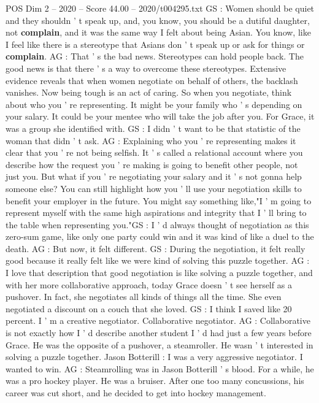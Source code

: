 \begin{textsample}{POS Dim 2 – 2020 – Score 44.00 – 2020/t004295.txt}
GS : Women should be quiet and they shouldn ' t speak up, and, you know, you should be a dutiful daughter, not \textbf{complain}, and it was the same way I felt about being Asian.
You know, like I feel like there is a stereotype that Asians don ' t speak up or ask for things or \textbf{complain}.
AG : That ' s the bad news.
Stereotypes can hold people back.
The good news is that there ' s a way to overcome these stereotypes.
Extensive evidence reveals that when women negotiate on behalf of others, the backlash vanishes.
Now being tough is an act of caring.
So when you negotiate, think about who you ' re representing.
It might be your family who ' s depending on your salary.
It could be your mentee who will take the job after you.
For Grace, it was a group she identified with.
GS : I didn ' t want to be that statistic of the woman that didn ' t ask.
AG : Explaining who you ' re representing makes it clear that you ' re not being selfish.
It ' s called a relational account where you describe how the request you ' re making is going to benefit other people, not just you.
But what if you ' re negotiating your salary and it ' s not gonna help someone else?
You can still highlight how you ' ll use your negotiation skills to benefit your employer in the future.
You might say something like,"I ' m going to represent myself with the same high aspirations and integrity that I ' ll bring to the table when representing you."GS : I ' d always thought of negotiation as this zero-sum game, like only one party could win and it was kind of like a duel to the death.
AG : But now, it felt different.
GS : During the negotiation, it felt really good because it really felt like we were kind of solving this puzzle together.
AG : I love that description that good negotiation is like solving a puzzle together, and with her more collaborative approach, today Grace doesn ' t see herself as a pushover.
In fact, she negotiates all kinds of things all the time.
She even negotiated a discount on a couch that she loved.
GS : I think I saved like 20 percent.
I ' m a creative negotiator.
Collaborative negotiator.
AG : Collaborative is not exactly how I ' d describe another student I ' d had just a few years before Grace.
He was the opposite of a pushover, a steamroller.
He wasn ' t interested in solving a puzzle together.
Jason Botterill : I was a very aggressive negotiator.
I wanted to win.
AG : Steamrolling was in Jason Botterill ' s blood.
For a while, he was a pro hockey player.
He was a bruiser.
After one too many concussions, his career was cut short, and he decided to get into hockey management.

\end{textsample}
